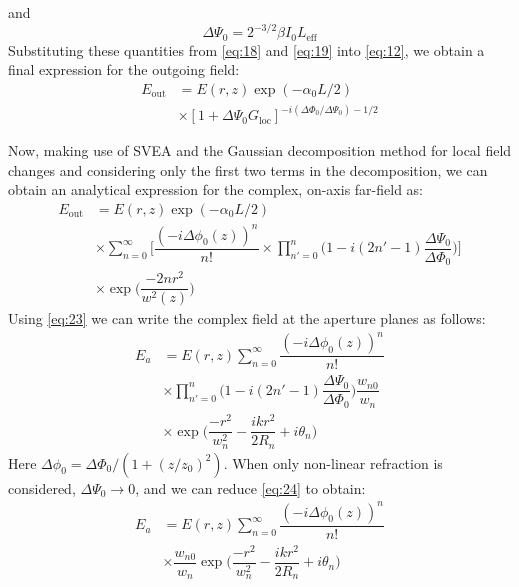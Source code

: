 \documentclass[%
 reprint,
 amsmath,amssymb,
 aps,
]{revtex4-2}
\begin{document}
		and
		\begin{equation}\label{key}
			\Delta \Psi_0 = 2^{-3/2} \beta I_0 L_{\mathrm{eff}}
		\end{equation}
		Substituting these quantities from \eqref{eq:18} and \eqref{eq:19} into \eqref{eq:12}, we
		obtain a final expression for the outgoing field:
		\begin{equation}\label{key}
			\begin{split}
				E_{\mathrm{out}} &= E(r,z) \exp (-\alpha_0 L/2) \\
				& \times [ 1+ \Delta \Psi_0 G_{\mathrm{loc}} ]^{-i(\Delta \Phi_0/\Delta \Psi_0)-1/2}
			\end{split}
		\end{equation}
		\par 
		Now, making use of SVEA and the Gaussian decomposition method for
		local field changes and considering only the first two terms in the decomposition, we can obtain an analytical expression for the complex, on-axis far-field as:
		\begin{equation}\label{eq:23}
			\begin{split}
				E_{\mathrm{out}} &= E(r,z) \exp (-\alpha_0 L/2) \\
				& \times \sum_{n=0}^{\infty} \Bigg[ \dfrac{(-i \Delta \phi_0(z))^n}{n!} \times \prod_{n'=0}^{n}\Bigg( 1 - i(2n'-1)\dfrac{\Delta \Psi_0}{\Delta \Phi_0} \Bigg) \Bigg] \\
				& \times \exp \Bigg( \dfrac{-2nr^2}{w^2(z)} \Bigg)
			\end{split}
		\end{equation}
		Using \eqref{eq:23} we can write the complex field at the aperture planes as
		follows:
		\begin{equation}\label{eq:24}
			\begin{split}
				E_{a} &= E(r,z) \sum_{n=0}^{\infty} \dfrac{(-i \Delta \phi_0(z))^n}{n!} \\
				& \times \prod_{n'=0}^{n}\Bigg( 1 - i(2n'-1)\dfrac{\Delta \Psi_0}{\Delta \Phi_0} \Bigg) \dfrac{w_{n0}}{w_n} \\
				& \times \exp \Bigg( \dfrac{-r^2}{w_n^2} - \dfrac{ikr^2}{2R_n} + i \theta_n \Bigg)
			\end{split}
		\end{equation}
		Here $ \Delta \phi_0 = \Delta \Phi_0 /(1+(z/z_0)^2) $. When only non-linear refraction is considered, $ \Delta \Psi_0 \rightarrow 0 $, and we can reduce \eqref{eq:24} to obtain:
		\begin{equation}\label{eq:25}
			\begin{split}
				E_{a} &= E(r,z) \sum_{n=0}^{\infty} \dfrac{(-i \Delta \phi_0(z))^n}{n!} \\
				& \times \dfrac{w_{n0}}{w_n} \exp \Bigg( \dfrac{-r^2}{w_n^2} - \dfrac{ikr^2}{2R_n} + i \theta_n \Bigg)
			\end{split}
		\end{equation}
\end{document}
